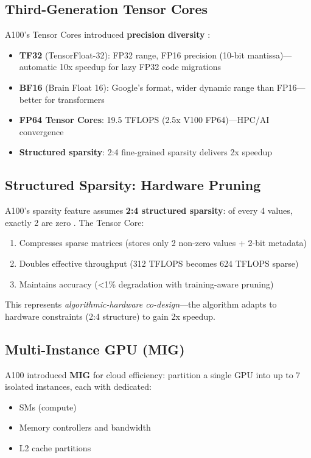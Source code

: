 \documentclass{article}
\begin{document}
\subsection{Third-Generation Tensor Cores}

A100's Tensor Cores introduced \textbf{precision diversity} \cite{nvidia2020ampere}:

\begin{itemize}
\item \textbf{TF32} (TensorFloat-32): FP32 range, FP16 precision (10-bit mantissa)—automatic 10x speedup for lazy FP32 code migrations
\item \textbf{BF16} (Brain Float 16): Google's format, wider dynamic range than FP16—better for transformers
\item \textbf{FP64 Tensor Cores}: 19.5 TFLOPS (2.5x V100 FP64)—HPC/AI convergence
\item \textbf{Structured sparsity}: 2:4 fine-grained sparsity delivers 2x speedup
\end{itemize}

\subsection{Structured Sparsity: Hardware Pruning}

A100's sparsity feature assumes \textbf{2:4 structured sparsity}: of every 4 values, exactly 2 are zero \cite{mishra2021accelerating}. The Tensor Core:
\begin{enumerate}
\item Compresses sparse matrices (stores only 2 non-zero values + 2-bit metadata)
\item Doubles effective throughput (312 TFLOPS becomes 624 TFLOPS sparse)
\item Maintains accuracy (<1\% degradation with training-aware pruning)
\end{enumerate}

This represents \textit{algorithmic-hardware co-design}—the algorithm adapts to hardware constraints (2:4 structure) to gain 2x speedup.

\subsection{Multi-Instance GPU (MIG)}

A100 introduced \textbf{MIG} for cloud efficiency: partition a single GPU into up to 7 isolated instances, each with dedicated:
\begin{itemize}
\item SMs (compute)
\item Memory controllers and bandwidth
\item L2 cache partitions
\end{itemize}
\end{document}
